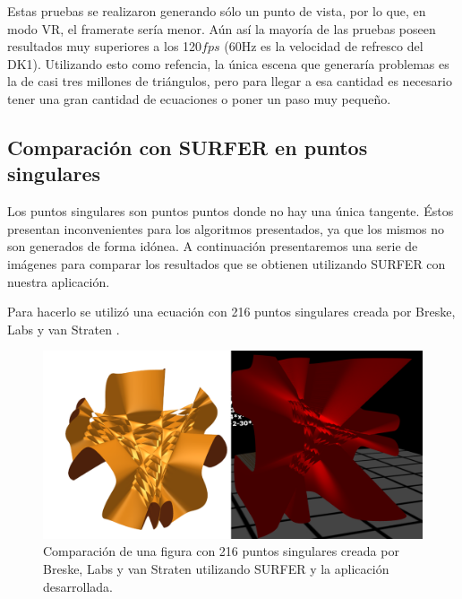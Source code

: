 \documentclass[12pt]{article}
\begin{document}
Estas pruebas se realizaron generando sólo un punto de vista, por lo que, en modo VR, el framerate sería menor. Aún así la mayoría de las pruebas poseen resultados muy superiores a los 120$fps$ (60Hz es la velocidad de refresco del DK1). Utilizando esto como refencia, la única escena que generaría problemas es la de casi tres millones de triángulos, pero para llegar a esa cantidad es necesario tener una gran cantidad de ecuaciones o poner un paso muy pequeño.

\subsection{Comparación con SURFER en puntos singulares}
\noindent Los puntos singulares son puntos puntos donde no hay una única tangente. Éstos presentan inconvenientes para los algoritmos presentados, ya que los mismos no son generados de forma idónea. A continuación presentaremos una serie de imágenes para comparar los resultados que se obtienen utilizando SURFER con nuestra aplicación. 

Para hacerlo se utilizó una ecuación con 216 puntos singulares creada por Breske, Labs y van Straten \cite{216s}.
\begin{figure}[h!]
\includegraphics[width=\linewidth]{comp1.png}
\caption{Comparación de una figura con 216 puntos singulares creada por Breske, Labs y van Straten utilizando SURFER y la aplicación desarrollada.}
\label{svi1}
\end{figure}
\end{document}
